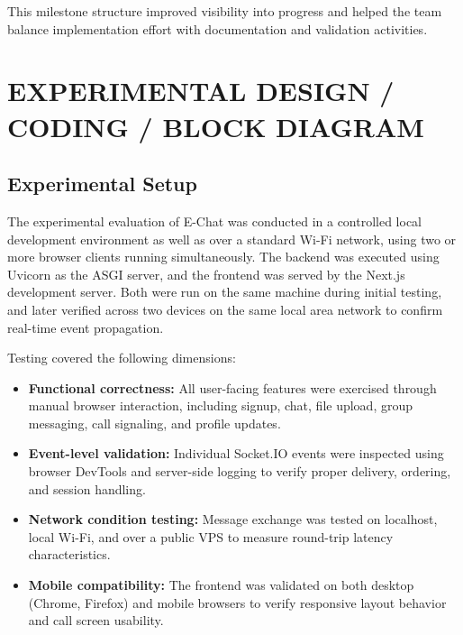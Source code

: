 \documentclass[12pt,a4paper,oneside]{report}
\begin{document}
This milestone structure improved visibility into progress and helped the team
balance implementation effort with documentation and validation activities.

\cleardoublepage

\chapter{EXPERIMENTAL DESIGN / CODING / BLOCK DIAGRAM}
\label{chap:experimental}
\thispagestyle{plain}

\section{Experimental Setup}
\label{sec:experimental-setup}

The experimental evaluation of E-Chat was conducted in a controlled local
development environment as well as over a standard Wi-Fi network, using two
or more browser clients running simultaneously. The backend was executed
using Uvicorn as the ASGI server, and the frontend was served by the Next.js
development server. Both were run on the same machine during initial testing,
and later verified across two devices on the same local area network to
confirm real-time event propagation.

Testing covered the following dimensions:
\begin{itemize}
  \item \textbf{Functional correctness:} All user-facing features were exercised through
        manual browser interaction, including signup, chat, file upload, group messaging,
        call signaling, and profile updates.
  \item \textbf{Event-level validation:} Individual Socket.IO events were inspected
        using browser DevTools and server-side logging to verify proper delivery,
        ordering, and session handling.
  \item \textbf{Network condition testing:} Message exchange was tested on localhost,
        local Wi-Fi, and over a public VPS to measure round-trip latency
        characteristics.
  \item \textbf{Mobile compatibility:} The frontend was validated on both desktop
        (Chrome, Firefox) and mobile browsers to verify responsive layout behavior
        and call screen usability.
\end{itemize}
\end{document}
